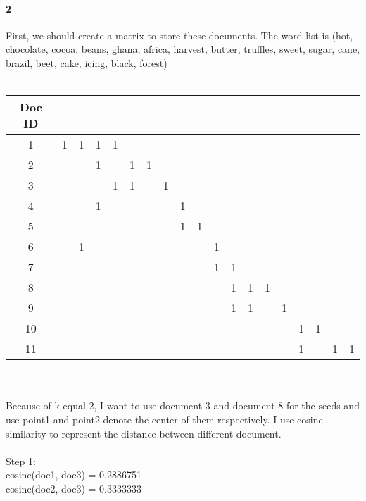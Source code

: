 \documentclass{article}
\begin{document}
		\paragraph{2}
		First, we should create a matrix to store these documents. The word list is (hot, chocolate, cocoa, beans, ghana, africa, harvest, butter, truffles, sweet, sugar, cane, brazil, beet, cake, icing, black, forest) \\ \\
		\begin{tabular}{|c|c|c|c|c|c|c|c|c|c|c|c|c|c|c|c|c|c|c|}
			\hline
			Doc ID &  &  &  &  &  &  &  &  &  &  &  &  &  &  &  &  &  &   \\
			\hline
			1 & 1 & 1 & 1 & 1 &  &  &  &  &  &  &  &  &  &  &  &  &  &    \\
			\hline
			2 &  &  & 1 &  & 1 & 1 &  &  &  &  &  &  &  &  &  &  &  &  \\
			\hline
			3 &  &  &  & 1 & 1 &  & 1 &  &  &  &  &  &  &  &  &  &  &  \\
			\hline
			4 &  &  & 1 &  &  &  &  & 1 &  &  &  &  &  &  &  &  &  &  \\
			\hline
			5 &  &  &  &  &  &  &  & 1 & 1 &  &  &  &  &  &  &  &  &  \\
			\hline
			6 &  & 1 &  &  &  &  &  &  &  & 1 &  &  &  &  &  &  &  & \\
			\hline
			7 &  &  &  &  &  &  &  &  &  & 1 & 1 &  &  &  &  &  &  & \\
			\hline
			8 &  &  &  &  &  &  &  &  &  &  & 1 & 1 & 1 &  &  &  &  & \\
			\hline
			9 &  &  &  &  &  &  &  &  &  &  & 1 & 1 &  & 1 &  &  &  & \\
			\hline
			10 & &  &  &  &  &  &  &  &  &  &  &  &  &  & 1 & 1 &  & \\
			\hline
			11 & &  &  &  &  &  &  &  &  &  &  &  &  &  & 1 &  & 1 & 1\\
			\hline
		\end{tabular} \\ \\
		Because of k equal 2, I want to use document 3 and document 8 for the seeds and use point1 and point2 denote the center of them respectively. I use cosine similarity to represent the distance between different document.\\ \\
		Step 1: \\ 
		cosine(doc1, doc3) = 0.2886751 \\ 
		cosine(doc2, doc3) = 0.3333333 \\
\end{document}

